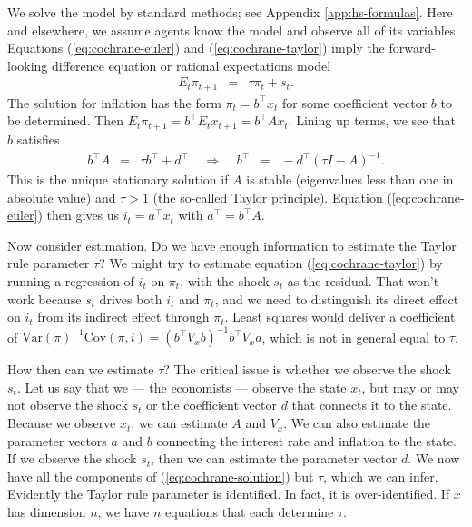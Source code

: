 \documentclass[11pt]{article}
\newcounter{tab}
\begin{document}
{We solve the model by standard methods;
see Appendix \ref{app:hs-formulas}.
Here and elsewhere, we assume agents know the model
and observe all of its variables.
Equations (\ref{eq:cochrane-euler}) and (\ref{eq:cochrane-taylor})
imply the forward-looking difference equation
or rational expectations model
\begin{eqnarray*}
    E_t \pi_{t+1}&=& \tau \pi_t + s_t .
\end{eqnarray*}
The solution for inflation has the form $\pi_t = b^\top x_t $
for some coefficient vector $b$ to be determined.
Then $ E_t \pi_{t+1} = b^\top E_t x_{t+1} = b^\top  A  x_t$.
Lining up terms, we see that $b$ satisfies
\begin{eqnarray}
      b^\top  A   &=& \tau b^\top + d^\top
      \;\;\;\;\Rightarrow \;\;\;\; b^\top \;\;=\;\; - d^\top (\tau I -  A )^{-1}  .
    \label{eq:cochrane-solution}
\end{eqnarray}
This is the unique stationary solution if $ A $ is stable
(eigenvalues less than one in absolute value)
and $\tau> 1$ (the so-called Taylor principle).
Equation (\ref{eq:cochrane-euler}) then gives us
$ i_t = a^\top x_t$ with $a^\top = b^\top A $.


Now consider estimation. Do we have enough information
to estimate the Taylor rule parameter $\tau$?
We might try to estimate equation (\ref{eq:cochrane-taylor})
by running a regression of $i_t$ on $\pi_t$, with the shock $s_t$ as the residual.
That won't work because $s_t$ drives both $i_t$ and $\pi_t$,
and we need to distinguish its direct effect on $i_t$ from its indirect effect through $\pi_t$.
Least squares would deliver a coefficient of
$\mbox{Var}(\pi)^{-1} \mbox{Cov}(\pi,i) = (b^{\top}V_x b)^{-1} b^{\top} V_x a$,
which is not in general equal to $\tau$.

How then can we estimate $\tau$?
The critical issue is whether we observe the shock $s_t$.
Let us say that we --- the economists --- observe the state $x_t$,
but may or may not observe the shock $s_t$ or the coefficient vector $d$ that connects it to
the state.
Because we observe $x_t$, we can estimate $ A $ and $V_x$.
We can also estimate the parameter vectors $a$ and $b$
connecting the interest rate and inflation to the state.
If we observe the shock $s_t$, then we can estimate the parameter vector $d$.
We now have all the components of (\ref{eq:cochrane-solution}) but $\tau$,
which we can infer.
Evidently the Taylor rule parameter is identified.
In fact, it is over-identified.
If $x$ has dimension $n$, we have $n$ equations that each determine $\tau$.

}
\end{document}
